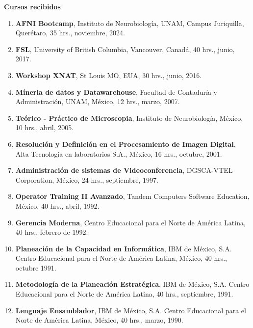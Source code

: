 {\large\textbf{\color{red} Cursos recibidos}}

\begin{enumerate}

\item \textbf{AFNI Bootcamp}, Instituto de Neurobiología, UNAM, Campus Juriquilla, Querétaro, 35 hrs., noviembre, 2024.

\item \textbf{FSL}, University of British Columbia, Vancouver, 
Canadá, 40 hrs., junio, 2017. 

\item \textbf{Workshop XNAT}, St Louis MO, EUA, 30 hrs., junio, 2016. 

\item \textbf{Míneria de datos y Datawarehouse}, Facultad de Contaduría y Administración, UNAM, México, 12 hrs., marzo, 2007.

\item \textbf{Teórico - Práctico de Microscopia}, Instituto de Neurobiología, México, 10 hrs., abril, 2005.

\item \textbf{Resolución y Definición en el Procesamiento de Imagen Digital}, Alta Tecnología en laboratorios S.A., México, 16 hrs., octubre, 2001.

\item \textbf{Administración de sistemas de Videoconferencia}, DGSCA-VTEL Corporation, México, 24 hrs., septiembre, 1997.

\item \textbf{Operator Training II Avanzado}, Tandem Computers Software Education, México, 40 hrs., abril,  1992.

\item \textbf{Gerencia Moderna}, Centro Educacional para el Norte de América Latina, 40 hrs., febrero de 1992.

\item \textbf{Planeación de la Capacidad en Informática}, IBM de México, S.A. Centro Educacional para el Norte de América Latina, México, 40 hrs., 
octubre 1991.

\item \textbf{Metodología de la Planeación Estratégica}, IBM de México, S.A. Centro Educacional para el Norte de América Latina, 40 hrs., septiembre, 1991.
 
\item \textbf{Lenguaje Ensamblador}, IBM de México, S.A. Centro Educacional para el Norte de América Latina, México, 40 hrs., marzo, 1990.
 

\end{enumerate}
